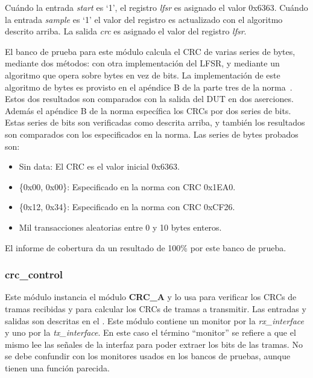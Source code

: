 \documentclass[a4paper, twoside, 11pt]{report}
\begin{document}
Cuándo la entrada \textit{start} es ‘1’, el registro \textit{lfsr} es asignado el valor 0x6363. Cuándo la entrada \textit{sample} es ‘1’ el valor del registro es actualizado con el algoritmo descrito arriba. La salida \textit{crc} es asignado el valor del registro \textit{lfsr}.

El banco de prueba para este módulo calcula el CRC de varias series de bytes, mediante dos métodos: con otra implementación del LFSR, y mediante un algoritmo que opera sobre bytes en vez de bits. La implementación de este algoritmo de bytes es provisto en el apéndice B de la parte tres de la norma~\cite{iso14443-3}. Estos dos resultados son comparados con la salida del DUT en dos aserciones. Además el apéndice B de la norma específica los CRCs por dos series de bits. Estas series de bits son verificadas como descrita arriba, y también los resultados son comparados con los especificados en la norma. Las series de bytes probados son:

\begin{itemize}
  \item Sin data: El CRC es el valor inicial 0x6363.
  \item \{0x00, 0x00\}: Especificado en la norma con CRC 0x1EA0.
  \item \{0x12, 0x34\}: Especificado en la norma con CRC 0xCF26.
  \item Mil transacciones aleatorias entre 0 y 10 bytes enteros.
\end{itemize}

El informe de cobertura da un resultado de 100\% por este banco de prueba.

\FloatBarrier
\subsubsection{crc\_control}

Este módulo instancia el módulo \textbf{CRC\_A} y lo usa para verificar los CRCs de tramas recibidas y para calcular los CRCs de tramas a transmitir. Las entradas y salidas son descritas en el . Este módulo contiene un monitor por la \textit{rx\_interface} y uno por la \textit{tx\_interface}. En este caso el término “monitor” se refiere a que el mismo lee las señales de la interfaz para poder extraer los bits de las tramas. No se debe confundir con los monitores usados en los bancos de pruebas, aunque tienen una función parecida.
\end{document}
